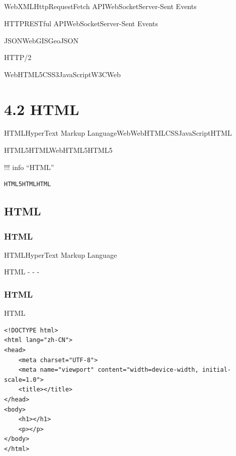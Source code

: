 \hypertarget{section-13}{%
\subsection{}\label{section-13}}

WebXMLHttpRequestFetch APIWebSocketServer-Sent Events

HTTPRESTful APIWebSocketServer-Sent Events

JSONWebGISGeoJSON

HTTP/2

WebHTML5CSS3JavaScriptW3CWeb

\hypertarget{html}{%
\section{4.2 HTML}\label{html}}

HTMLHyperText Markup LanguageWebWebHTMLCSSJavaScriptHTML

HTML5HTMLWebHTML5HTML5

!!! info ``HTML''

\begin{verbatim}
HTML5HTMLHTML
\end{verbatim}

\hypertarget{html-1}{%
\subsection{HTML}\label{html-1}}

\hypertarget{html-2}{%
\subsubsection{HTML}\label{html-2}}

HTMLHyperText Markup Language\important{}

HTML -  -  - 

\hypertarget{html-3}{%
\subsubsection{HTML}\label{html-3}}

HTML

\begin{lstlisting}[style=xml]
<!DOCTYPE html>
<html lang="zh-CN">
<head>
    <meta charset="UTF-8">
    <meta name="viewport" content="width=device-width, initial-scale=1.0">
    <title></title>
</head>
<body>
    <h1></h1>
    <p></p>
</body>
</html>
\end{lstlisting}

